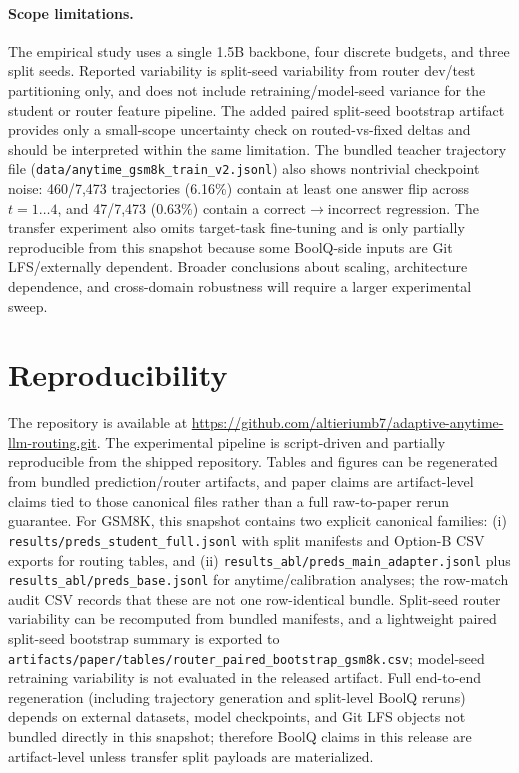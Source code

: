 \documentclass[conference]{IEEEtran}
\begin{document}
\paragraph{Scope limitations.}
The empirical study uses a single 1.5B backbone, four discrete budgets, and three split seeds. Reported variability is split-seed variability from router dev/test partitioning only, and does not include retraining/model-seed variance for the student or router feature pipeline. The added paired split-seed bootstrap artifact provides only a small-scope uncertainty check on routed-vs-fixed deltas and should be interpreted within the same limitation. The bundled teacher trajectory file (\texttt{data/anytime\_gsm8k\_train\_v2.jsonl}) also shows nontrivial checkpoint noise: 460/7,473 trajectories (6.16\%) contain at least one answer flip across $t{=}1\ldots4$, and 47/7,473 (0.63\%) contain a correct$\rightarrow$incorrect regression. The transfer experiment also omits target-task fine-tuning and is only partially reproducible from this snapshot because some BoolQ-side inputs are Git LFS/externally dependent. Broader conclusions about scaling, architecture dependence, and cross-domain robustness will require a larger experimental sweep.

\section{Reproducibility}
The repository is available at \url{https://github.com/altieriumb7/adaptive-anytime-llm-routing.git}. The experimental pipeline is script-driven and partially reproducible from the shipped repository. Tables and figures can be regenerated from bundled prediction/router artifacts, and paper claims are artifact-level claims tied to those canonical files rather than a full raw-to-paper rerun guarantee. For GSM8K, this snapshot contains two explicit canonical families: (i) \texttt{results/preds\_student\_full.jsonl} with split manifests and Option-B CSV exports for routing tables, and (ii) \texttt{results\_abl/preds\_main\_adapter.jsonl} plus \texttt{results\_abl/preds\_base.jsonl} for anytime/calibration analyses; the row-match audit CSV records that these are not one row-identical bundle. Split-seed router variability can be recomputed from bundled manifests, and a lightweight paired split-seed bootstrap summary is exported to \texttt{artifacts/paper/tables/router\_paired\_bootstrap\_gsm8k.csv}; model-seed retraining variability is not evaluated in the released artifact. Full end-to-end regeneration (including trajectory generation and split-level BoolQ reruns) depends on external datasets, model checkpoints, and Git LFS objects not bundled directly in this snapshot; therefore BoolQ claims in this release are artifact-level unless transfer split payloads are materialized.
\end{document}
